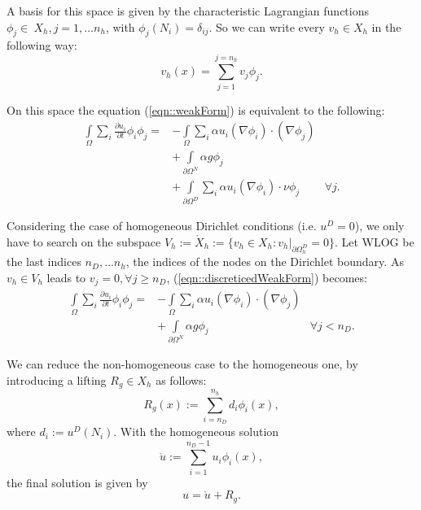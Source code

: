 A basis for this space is given by the characteristic Lagrangian functions $\phi_j\in\ X_h, j=1,\dots n_h$, with $\phi_j(N_i) = \delta_{ij}$. So we can write every $v_h\in X_h$ in the following way:
\begin{equation*}
        v_h(x) = \sum_{j=1}^{j=n_h}v_j\phi_j.
\end{equation*}

On this space the equation (\ref{eqn::weakForm}) is equivalent to the following:
\begin{equation}
\label{eqn::discreticedWeakForm}
\begin{aligned}
        \int\limits_{\Omega} \sum_i \frac{\partial u_i}{\partial t} \phi_i \phi_j = &-\int\limits_{\Omega} \sum_i \alpha u_i(\nabla \phi_i) \cdot (\nabla \phi_j) \\
        &+ \int\limits_{\partial\Omega^N} \alpha g\phi_j \\
        &+ \int\limits_{\partial\Omega^D} \sum_i \alpha u_i (\nabla \phi_i) \cdot \nu \phi_j & \forall j.
\end{aligned}
\end{equation}

Considering the case of homogeneous Dirichlet conditions (i.e. $u^D=0$), we only have to search on the subspace $V_h:=\mathring{X}_h:=\{v_h\in X_h : v_h|_{\partial\Omega_h^D} = 0\}$. Let WLOG be the last indices $n_D,\dots n_h$, the indices of the nodes on the Dirichlet boundary. As $v_h\in V_h$ leads to $v_j = 0, \forall j\geq n_D$, (\ref{eqn::discreticedWeakForm}) becomes:
\begin{equation}
\label{eqn::homogeneousForm}
\begin{aligned}
        \int\limits_{\Omega} \sum_i \frac{\partial u_i}{\partial t} \phi_i \phi_j = &-\int\limits_{\Omega} \sum_i \alpha u_i(\nabla \phi_i) \cdot (\nabla \phi_j) \\
        &+ \int\limits_{\partial\Omega^N} \alpha g\phi_j
         & \forall j < n_D.
\end{aligned}
\end{equation}

We can reduce the non-homogeneous case to the homogeneous one, by introducing a lifting $R_g\in X_h$ as follows:
\begin{equation*}
        R_g(x) := \sum_{i=n_D}^{n_h}d_i \phi_i(x),
\end{equation*}
where $d_i:=u^D(N_i)$. With the homogeneous solution
\begin{equation*}
        \mathring{u} := \sum_{i=1}^{n_D-1}u_i \phi_i(x),
\end{equation*}
the final solution is given by
\begin{equation}
        \label{eqn::fullu}
        u = \mathring{u} + R_g.
\end{equation}


